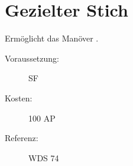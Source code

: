 \section{Gezielter Stich}
\label{sf.gezielter_stich}
Ermöglicht das Manöver .
\begin{description}
    \item[Voraussetzung:]
        SF 
    \item [Kosten:]
        100 AP
    \item [Referenz:]
        WDS 74
\end{description}
